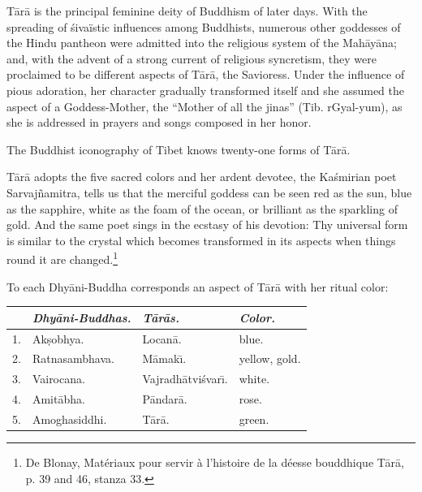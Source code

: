 \documentclass[a4paper, 12pt, oneside]{article}
\begin{document}
T\={a}r\={a} is the principal feminine deity of Buddhism of later days. With the spreading of \'{s}ivaïstic influences among Buddhists, numerous other goddesses of the Hindu pantheon were admitted into the religious system of the Mah\={a}y\={a}na; and, with the advent of a strong current of religious syncretism, they were proclaimed to be different aspects of T\={a}r\={a}, the Savioress. Under the influence of pious adoration, her character gradually transformed itself and she assumed the aspect of a Goddess-Mother, the ``Mother of all the jinas'' (Tib. rGyal-yum), as she is addressed in prayers and songs composed in her honor.

The Buddhist iconography of Tibet knows twenty-one forms of T\={a}r\={a}.

T\={a}r\={a} adopts the five sacred colors and her ardent devotee, the Ka\'{s}mirian poet Sarvaj\~{n}amitra, tells us that the merciful goddess can be seen red as the sun, blue as the sapphire, white as the foam of the ocean, or brilliant as the sparkling of gold. And the same poet sings in the ecstasy of his devotion: Thy universal form is similar to the crystal which becomes transformed in its aspects when things round it are changed.\footnote{De Blonay, Matériaux pour servir à l'histoire de la déesse bouddhique T\={a}r\={a}, p. 39 and 46, stanza 33.}

To each Dhy\={a}ni-Buddha corresponds an aspect of T\={a}r\={a} with her ritual color:

\begin{table}[H]
    \small
    \bfseries
    \centering
    \begin{tabular}{l l l l}
        ~ &  \emph{Dhy\={a}ni-Buddhas.}  &  \emph{T\={a}r\={a}s.}             &  \emph{Color.}         \\ \hline
        1. &  Ak\d{s}obhya.        &  Locan\={a}.            &  blue.          \\
        2. &  Ratnasambhava.   &  M\={a}mak\={\i}.            &  yellow, gold.  \\
        3. &  Vairocana.       &  Vajradh\={a}tvi\'{s}var\={\i}.  &  white.         \\
        4. &  Amit\={a}bha.        &  P\={a}ndar\={a}.           &  rose.          \\
        5. &  Amoghasiddhi.    &  T\={a}r\={a}.              &  green. \\
    \end{tabular}
\end{table}
\end{document}
